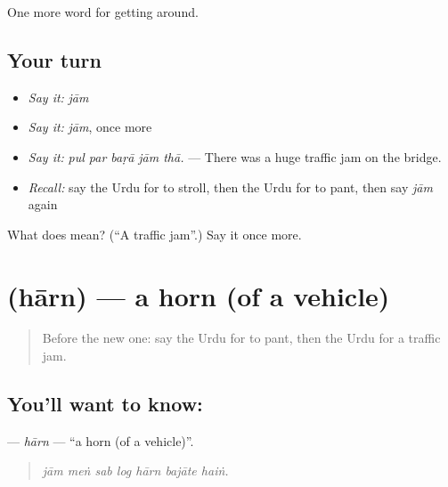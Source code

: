 \begin{grammarlens}[title={What you've built}]
One more word for getting around.
\end{grammarlens}

\subsection*{Your turn}
\begin{itemize}
\raggedright
  \item \emph{Say it:} \emph{jām}
  \item \emph{Say it:} \emph{jām}, once more
  \item \emph{Say it:} \emph{pul par baṛā jām thā.} — There was a huge traffic jam on the bridge.
  \item \emph{Recall:} say the Urdu for to stroll, then the Urdu for to pant, then say \emph{jām} again
\end{itemize}

\begin{tcolorbox}[breakable,colback=teal!4,colframe=teal!35!black,title={Before you move on}]
What does  mean? (\textquotedblleft{}A traffic jam\textquotedblright{}.) Say it once more.
\end{tcolorbox}
\section[\texorpdfstring{\ur{ہارن} (hārn)}{ہارن (hārn)}]{ (hārn) — a horn (of a vehicle)}

\label{lesson:UR-C393-harn}



\begin{quote}
Before the new one: say the Urdu for to pant, then the Urdu for a traffic jam.
\end{quote}

\subsection*{You'll want to know: }
\textbf{} — \emph{hārn} — \textquotedblleft{}a horn (of a vehicle)\textquotedblright{}.

\begin{quote}
      
\end{quote}

\begin{quote}
\emph{jām meṅ sab log hārn bajāte haiṅ.}
\end{quote}

